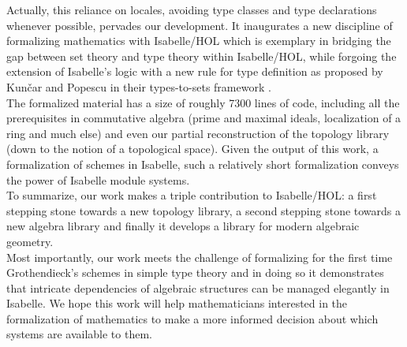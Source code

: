 \documentclass[12pt]{scrartcl}
\begin{document}
Actually, this reliance on locales, avoiding type classes and type declarations whenever possible, pervades our development. It inaugurates a new discipline of formalizing mathematics with Isabelle/HOL which is exemplary in bridging the gap between set theory and type theory within Isabelle/HOL, while forgoing the extension of Isabelle's logic with a new rule for type definition as proposed by Kun\v{c}ar and Popescu in their types-to-sets framework \cite{typestosets}. \\
The formalized material has a size of roughly 7300 lines of code, including all the prerequisites in commutative  algebra (prime and maximal ideals, localization of a ring and much else) and even our partial reconstruction of the topology library (down to the notion of a topological space). Given the output of this work, a formalization of schemes in Isabelle, such a relatively short formalization conveys the power of Isabelle module systems. \\
To summarize, our work makes a triple contribution to Isabelle/HOL: a first stepping stone towards a new topology library, a second stepping stone towards a new algebra library and finally it develops a library for modern algebraic geometry. \\
Most importantly, our work meets the challenge of formalizing for the first time Grothendieck's schemes in simple type theory and in doing so it demonstrates that intricate dependencies of algebraic structures can be managed elegantly in Isabelle. We hope this work will help mathematicians interested in the formalization of mathematics to make a more informed decision about which systems are available to them.
\end{document}
